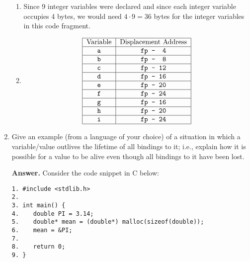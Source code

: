 \documentclass[9pt]{article}
\begin{document}
\begin{enumerate}
   \begin{enumerate}
      \item Since 9 integer variables were declared and since each integer
            variable occupies 4 bytes, we would need $4 \cdot 9 = 36$ bytes
            for the integer variables in this code fragment.
      \item $$
               \begin{tabular}{@{}|c|c|@{}} \hline
                  Variable & Displacement Address \\ \hline
                  \verb|a| & \verb|fp -  4| \\ \hline
                  \verb|b| & \verb|fp -  8| \\ \hline
                  \verb|c| & \verb|fp - 12| \\ \hline
                  \verb|d| & \verb|fp - 16| \\ \hline
                  \verb|e| & \verb|fp - 20| \\ \hline
                  \verb|f| & \verb|fp - 24| \\ \hline
                  \verb|g| & \verb|fp - 16| \\ \hline
                  \verb|h| & \verb|fp - 20| \\ \hline
                  \verb|i| & \verb|fp - 24| \\ \hline
               \end{tabular}
            $$
   \end{enumerate}
   \item Give an example (from a language of your choice) of a situation in
         which a variable/value outlives the lifetime of all bindings to it;
         i.e., explain how it is possible for a value to be alive even though
         all bindings to it have been lost.

      \textbf{Answer.} Consider the code snippet in C below:
\begin{verbatim}
1. #include <stdlib.h>
2.
3. int main() {
4.    double PI = 3.14;
5.    double* mean = (double*) malloc(sizeof(double));
6.    mean = &PI;
7.
8.    return 0;
9. }
\end{verbatim}


\end{enumerate}
\end{document}

